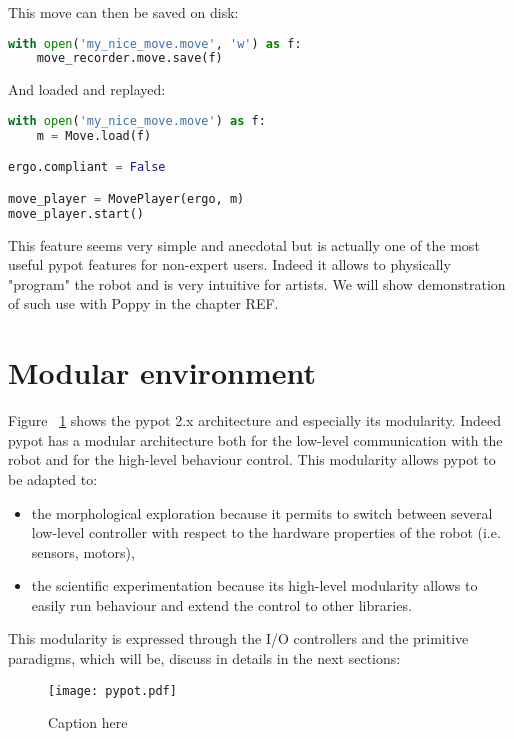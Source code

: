 This move can then be saved on disk:
\begin{lstlisting}[language = Python]
with open('my_nice_move.move', 'w') as f:
    move_recorder.move.save(f)
\end{lstlisting}

And loaded and replayed:
\begin{lstlisting}[language = Python]
with open('my_nice_move.move') as f:
    m = Move.load(f)

ergo.compliant = False

move_player = MovePlayer(ergo, m)
move_player.start()
\end{lstlisting}

This feature seems very simple and anecdotal but is actually one of the most useful pypot features for non-expert users. Indeed it allows to physically "program" the robot and is very intuitive for artists. We will show demonstration of such use with Poppy in the chapter REF.



\section{Modular environment} %

Figure \figurename~\ref{fig:pypot-modular-architecture} shows the pypot 2.x architecture and especially its modularity. Indeed pypot has a modular architecture both for the low-level communication with the robot and for the high-level behaviour control. This modularity allows pypot to be adapted to:

\begin{itemize}
    \item the morphological exploration because it permits to switch between several low-level controller with respect to the hardware properties of the robot (i.e. sensors, motors),
    \item the scientific experimentation because its high-level modularity allows to easily run behaviour and extend the control to other libraries.
\end{itemize}

This modularity is expressed through the I/O controllers and the primitive paradigms, which will be, discuss in details in the next sections:


\begin{figure}[p]
    \begin{center}
        \texttt{[image: pypot.pdf]}
    \end{center}
    \caption{Caption here}
    \label{fig:pypot-modular-architecture}
\end{figure}


